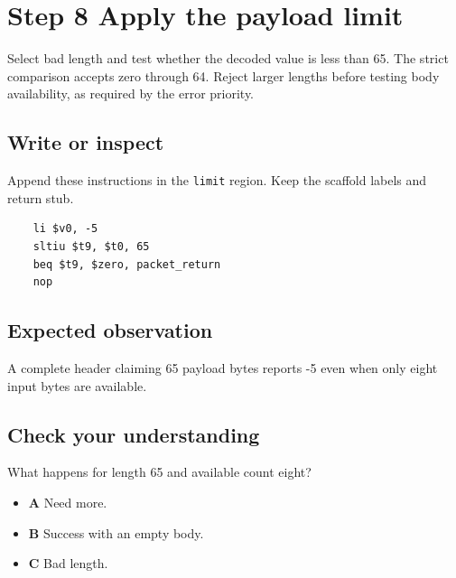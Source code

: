 \section{Step 8 Apply the payload limit}\label{packet-s08}

Select bad length and test whether the decoded value is less than 65. The strict comparison accepts zero through 64. Reject larger lengths before testing body availability, as required by the error priority.

\subsection{Write or inspect}
Append these instructions in the \texttt{limit} region. Keep the scaffold labels and return stub.

\begin{verbatim}
    li $v0, -5
    sltiu $t9, $t0, 65
    beq $t9, $zero, packet_return
    nop
\end{verbatim}

\subsection{Expected observation}
A complete header claiming 65 payload bytes reports -5 even when only eight input bytes are available.

\subsection{Check your understanding}
What happens for length 65 and available count eight?

\begin{itemize}
  \item \textbf{A} Need more.
  \item \textbf{B} Success with an empty body.
  \item \textbf{C} Bad length.
\end{itemize}
